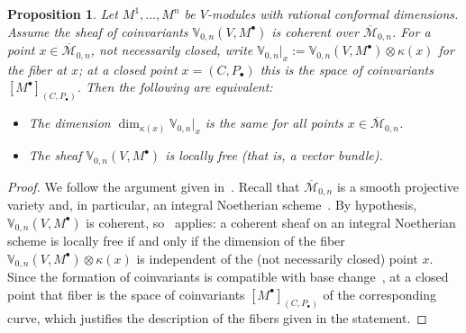 \documentclass[12pt,a4paper,reqno]{amsart}
\numberwithin{equation}{section}
\newtheorem{proposition}[theorem]{Proposition}
\theoremstyle{definition}
\newcommand{\C}{\mathbb{C}}
\newcommand{\M}{\mathcal{M}}
\newcommand{\lb}{\llbracket}
\newcommand{\rb}{\rrbracket}
\def\o{\otimes}
\def\VV{\mathbb{V}}
\begin{document}
\begin{proposition}\label{prop:flatness}
    Let $M^1,\dots, M^n$ be $V$-modules with rational conformal dimensions. Assume the sheaf of coinvariants $\VV_{0,n}(V,M^\bullet)$ is coherent over $\overline{\M}_{0,n}$. For a point $x\in \overline{\M}_{0,n}$, not necessarily closed, write $\VV_{0,n}|_x:=\VV_{0,n}(V,M^\bullet)\o\kappa(x)$ for the fiber at $x$; at a closed point $x=(C,P_\bullet)$ this is the space of coinvariants $[M^\bullet]_{(C,P_\bullet)}$. Then the following are equivalent:
    \begin{itemize}
        \item The dimension $\dim_{\kappa(x)}\VV_{0,n}|_x$ is the same for all points $x \in \overline{\M}_{0,n}$.
        \item The sheaf $\VV_{0,n}(V,M^\bullet)$ is locally free (that is, a vector bundle).
    \end{itemize}
\end{proposition}
\begin{proof}
    We follow the argument given in~\cite[Corollary 5.2.6]{DGK2}. %
    Recall that $\overline{\M}_{0,n}$ is a smooth projective variety and, in particular, an integral Noetherian scheme~\cite[Theorem 6.1]{Knudsen1983b}.    By hypothesis, $\VV_{0,n}(V,M^\bullet)$ is coherent, so~\cite[Exercise II.5.8]{Hartshorne} applies: a coherent sheaf on an integral Noetherian scheme is locally free if and only if the dimension of the fiber $\VV_{0,n}(V,M^\bullet)\o \kappa(x)$ is independent of the (not necessarily closed) point $x$. Since the formation of coinvariants is compatible with base change~\cite[Lemma 4.1.1]{DGK2}, at a closed point that fiber is the space of coinvariants $[M^\bullet]_{(C,P_\bullet)}$ of the corresponding curve, which justifies the description of the fibers given in the statement.
\end{proof}
\end{document}
